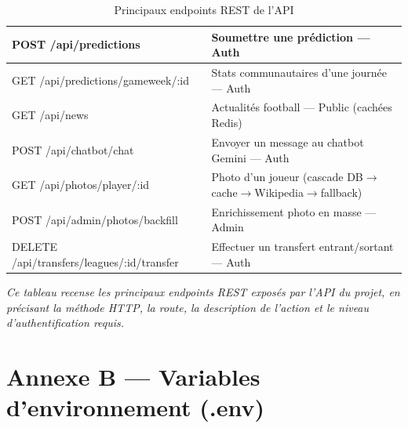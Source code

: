 \begin{table}[H]
\begin{tabularx}{\linewidth}{|l|X|}
        \hline
        POST /api/predictions & Soumettre une prédiction --- Auth \\
        \hline
        GET /api/predictions/gameweek/:id & Stats communautaires d'une journée --- Auth \\
        \hline
        GET /api/news & Actualités football --- Public (cachées Redis) \\
        \hline
        POST /api/chatbot/chat & Envoyer un message au chatbot Gemini --- Auth \\
        \hline
        GET /api/photos/player/:id & Photo d'un joueur (cascade DB$\rightarrow$cache$\rightarrow$Wikipedia$\rightarrow$fallback) \\
        \hline
        POST /api/admin/photos/backfill & Enrichissement photo en masse --- Admin \\
        \hline
        DELETE /api/transfers/leagues/:id/transfer & Effectuer un transfert entrant/sortant --- Auth \\
        \hline
    \end{tabularx}
\caption{Principaux endpoints REST de l'API}
\end{table}

\vspace{0.2cm}
\noindent\small\textit{Ce tableau recense les principaux endpoints REST exposés par l'API du projet, en précisant la méthode HTTP, la route, la description de l'action et le niveau d'authentification requis.}\normalsize

\section*{Annexe B --- Variables d'environnement (.env)}

\vspace{0.3cm}

